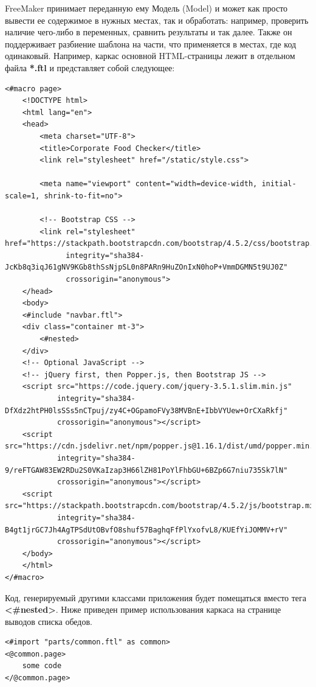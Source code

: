 \documentclass[a4paper]{article}
\begin{document}
FreeMaker принимает переданную ему Модель (Model) и может как просто вывести ее содержимое в нужных местах, так и обработать: например, проверить наличие чего-либо в переменных, сравнить результаты и так далее. Также он поддерживает разбиение шаблона на части, что применяется в местах, где код одинаковый. Например, каркас основной HTML-страницы лежит в отдельном файла \textbf{*.ftl} и представляет собой следующее:
\hfill\break
{}         
\begin{lstlisting}[label=lis9,caption=Шаблон основной страницы] 
<#macro page>
    <!DOCTYPE html>
    <html lang="en">
    <head>
        <meta charset="UTF-8">
        <title>Corporate Food Checker</title>
        <link rel="stylesheet" href="/static/style.css">

        <meta name="viewport" content="width=device-width, initial-scale=1, shrink-to-fit=no">

        <!-- Bootstrap CSS -->
        <link rel="stylesheet" href="https://stackpath.bootstrapcdn.com/bootstrap/4.5.2/css/bootstrap.min.css"
              integrity="sha384-JcKb8q3iqJ61gNV9KGb8thSsNjpSL0n8PARn9HuZOnIxN0hoP+VmmDGMN5t9UJ0Z"
              crossorigin="anonymous">
    </head>
    <body>
    <#include "navbar.ftl">
    <div class="container mt-3">
        <#nested>
    </div>
    <!-- Optional JavaScript -->
    <!-- jQuery first, then Popper.js, then Bootstrap JS -->
    <script src="https://code.jquery.com/jquery-3.5.1.slim.min.js"
            integrity="sha384-DfXdz2htPH0lsSSs5nCTpuj/zy4C+OGpamoFVy38MVBnE+IbbVYUew+OrCXaRkfj"
            crossorigin="anonymous"></script>
    <script src="https://cdn.jsdelivr.net/npm/popper.js@1.16.1/dist/umd/popper.min.js"
            integrity="sha384-9/reFTGAW83EW2RDu2S0VKaIzap3H66lZH81PoYlFhbGU+6BZp6G7niu735Sk7lN"
            crossorigin="anonymous"></script>
    <script src="https://stackpath.bootstrapcdn.com/bootstrap/4.5.2/js/bootstrap.min.js"
            integrity="sha384-B4gt1jrGC7Jh4AgTPSdUtOBvfO8shuf57BaghqFfPlYxofvL8/KUEfYiJOMMV+rV"
            crossorigin="anonymous"></script>
    </body>
    </html>
</#macro>
\end{lstlisting}

Код, генерируемый другими классами приложения будет помещаться вместо тега \textbf{<\#nested>}. Ниже приведен пример использования каркаса на странице выводов списка обедов.
\hfill\break
{}         
\begin{lstlisting}[label=lis10,caption=Вывод кода в созданном шаблоне] 
<#import "parts/common.ftl" as common>
<@common.page>
    some code
</@common.page>
\end{lstlisting}
\end{document}
